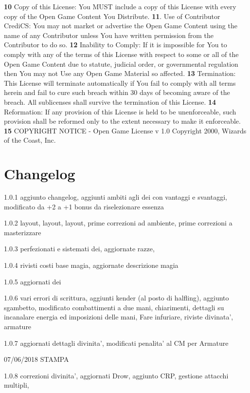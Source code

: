 \documentclass[a4paper,11pt,twoside,openany]{book}
\begin{document}
{{\textbf{10} Copy of this License: You MUST include a copy of this License with every copy of the Open Game Content You Distribute.
\textbf{11}. Use of Contributor CrediCS: You may not market or advertise the Open Game Content using the name of any Contributor unless You have written permission from the Contributor to do so.
\textbf{12} Inability to Comply: If it is impossible for You to comply with any of the terms of this License with respect to some or all of the Open Game Content due to statute, judicial order, or governmental regulation then You may not Use any Open Game Material so affected.
\textbf{13} Termination: This License will terminate automatically if You fail to comply with all terms herein and fail to cure such breach within 30 days of becoming aware of the breach. All sublicenses shall survive the termination of this License.
\textbf{14} Reformation: If any provision of this License is held to be unenforceable, such provision shall be reformed only to the extent necessary to make it enforceable.
\textbf{15} COPYRIGHT NOTICE - Open Game License v 1.0 Copyright 2000, Wizards of the Coast, Inc. }

\normalsize

\pagebreak

{\footnotesize 
\section{Changelog}

1.0.1 aggiunto changelog, aggiunti ambiti agli dei con vantaggi e svantaggi, modificato da +2 a +1 bonus da riselezionare essenza

1.0.2 layout, layout, layout, prime correzioni ad ambiente, prime correzioni a masterizzare

1.0.3 perfezionati e sistemati dei, aggiornate razze,

1.0.4 rivisti costi base magia, aggiornate descrizione magia

1.0.5 aggiornati dei

1.0.6 vari errori di scrittura, aggiunti kender (al posto di halfling), aggiunto sgambetto, modificato combattimenti a due mani, chiarimenti, dettagli su incanalare energia ed imposizioni delle mani, Fare infuriare, riviste divinata', armature 

1.0.7 aggiornati dettagli divinita', modificati penalita' al CM per Armature

07/06/2018 STAMPA

1.0.8 correzioni divinita', aggiornati Drow, aggiunto CRP, gestione attacchi multipli,

}}
\end{document}
